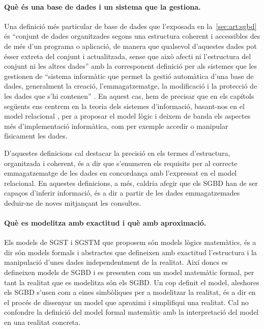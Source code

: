 \paragraph{Què és una base de dades i un sistema que la gestiona.}
Una definició més particular de base de dades que l'exposada en
la~\autoref{sec:art:sgbd} és ``conjunt de dades organitzades segons
una estructura coherent i accessibles des de més d'un programa o
aplicació, de manera que qualsevol d'aquestes dades pot ésser extreta
del conjunt i actualitzada, sense que això afecti ni l'estructura del
conjunt ni les altres dades'' \parencite[s.~v.~base de dades]{termcat}
amb la corresponent definició per als sistemes que les gestionen de
``sistema informàtic que permet la gestió automàtica d'una base de
dades, generalment la creació, l'emmagatzematge, la modificació i la
protecció de les dades que s'hi contenen'' \parencite[s.~v.~sistema de
gestió de bases de dades]{termcat}.  En aquest cas, hem de precisar
que en els capítols següents ens centrem en la teoria dels sistemes
d'informació, basant-nos en el model
relacional \parencite{date04:introduction8}, per a proposar el model
lògic i deixem de banda els aspectes més d'implementació informàtica,
com per exemple accedir o manipular físicament les dades.

D'aquestes definicions cal destacar la precisió en els termes
d'estructura, organitzada i coherent, és a dir que s'enumeren els
requisits per al correcte emmagatzematge de les dades en concordança
amb l'expressat en el model relacional.  En aquestes definicions, a
més, caldria afegir que els \gls{SGBD} han de ser capaços d'inferir
informació, és a dir a partir de les dades emmagatzemades deduir-ne de
noves mitjançant les consultes.





\paragraph{Què es modelitza amb exactitud i què amb aproximació.}
Els models de \gls{SGST} i \gls{SGSTM} que proposem són models lògics
matemàtics, és a dir són models formals i abstractes que defineixen
amb exactitud l'estructura i la manipulació d'unes dades
independentment de la realitat.  Així doncs es defineixen models de
\gls{SGBD} i es presenten com un model matemàtic formal, per tant la
realitat que es modelitza són els \gls{SGBD}. Un cop definit el model,
aleshores els \gls{SGBD} s'usen com a eines simbòliques per a
modelitzar la realitat, és a dir en el procés de dissenyar un model
que aproximi i simplifiqui una realitat. Cal no confondre la definició
del model formal matemàtic amb la interpretació del model en una
realitat concreta.

